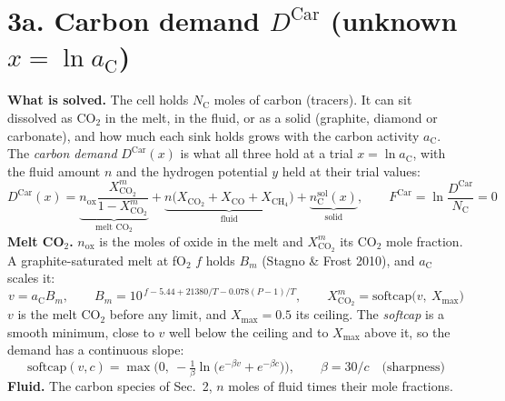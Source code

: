 \documentclass[11pt]{article}
\newcommand{\aC}{a_{\mathrm{C}}}
\newcommand{\nox}{n_{\mathrm{ox}}}
\newcommand{\Xm}[1]{X^{m}_{\mathrm{#1}}}
\begin{document}
\vspace*{\fill}
\clearpage
\section*{3a. Carbon demand $D^{\mathrm{Car}}$ \quad (unknown $x=\ln\aC$)}
\vspace*{\fill}
{\small\setlength{\abovedisplayskip}{13pt}\setlength{\belowdisplayskip}{13pt}\setlength{\abovedisplayshortskip}{13pt}\setlength{\belowdisplayshortskip}{13pt}
\textbf{What is solved.} The cell holds $N_{\mathrm C}$ moles of carbon (tracers). It can sit dissolved as CO$_2$ in the melt, in the fluid, or as a solid (graphite, diamond or carbonate), and how much each sink holds grows with the carbon activity $\aC$. The \emph{carbon demand} $D^{\mathrm{Car}}(x)$ is what all three hold at a trial $x=\ln\aC$, with the fluid amount $n$ and the hydrogen potential $y$ held at their trial values:
\begin{equation}
  D^{\mathrm{Car}}(x)=\underbrace{\nox\frac{\Xm{CO_2}}{1-\Xm{CO_2}}}_{\text{melt CO}_2}
  +\underbrace{n\big(X_{\mathrm{CO_2}}+X_{\mathrm{CO}}+X_{\mathrm{CH_4}}\big)}_{\text{fluid}}
  +\underbrace{n_{\mathrm C}^{\mathrm{sol}}(x)}_{\text{solid}},\qquad
  F^{\mathrm{Car}}=\ln\frac{D^{\mathrm{Car}}}{N_{\mathrm C}}=0
\end{equation}
\textbf{Melt CO$_2$.} $\nox$ is the moles of oxide in the melt and $\Xm{CO_2}$ its CO$_2$ mole fraction. A graphite-saturated melt at fO$_2$ $f$ holds $B_m$ (Stagno \& Frost 2010), and $\aC$ scales it:
\begin{equation}
  v=\aC B_m,\qquad B_m=10^{\,f-5.44+21380/T-0.078(P-1)/T},\qquad
  \Xm{CO_2}=\mathrm{softcap}\big(v,\ X_{\max}\big)
\end{equation}
$v$ is the melt CO$_2$ before any limit, and $X_{\max}=0.5$ its ceiling. The \emph{softcap} is a smooth minimum, close to $v$ well below the ceiling and to $X_{\max}$ above it, so the demand has a continuous slope:
\begin{equation}
  \mathrm{softcap}(v,c)=\max\!\Big(0,\ -\tfrac1\beta\ln\big(e^{-\beta v}+e^{-\beta c}\big)\Big),\qquad \beta=30/c\quad\text{(sharpness)}
\end{equation}
\textbf{Fluid.} The carbon species of Sec.~2, $n$ moles of fluid times their mole fractions.

}
\end{document}
